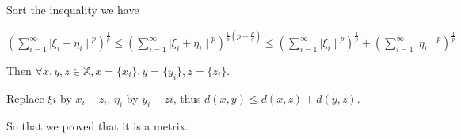 \documentclass[twoside,a4paper]{article}
\begin{document}
Sort the inequality we have 

$(\sum_{i=1}^{\infty}{\mid\xi_{i} + \eta_{i}\mid}^{p})^{\frac{1}{p}} \leq (\sum_{i=1}^{\infty}{\mid\xi_{i} + \eta_{i}\mid}^{p})^{\frac{1}{p}(p - \frac{p}{q})} \leq (\sum_{i=1}^{\infty}{\mid\xi_{i}\mid}^{p})^{\frac{1}{p}}+(\sum_{i=1}^{\infty}{\mid\eta_{i}\mid}^{p})^{\frac{1}{p}}$

Then $\forall x,y,z \in \mathbb{X}, x=\{x_{i}\}, y=\{y_{i}\}, z=\{z_{i}\}$.

Replace $\xi{i}$ by $x_{i} - z_{i}$, $\eta_{i}$ by $y_{i} - z{i}$, thus $d(x,y) \leq d(x,z) + d(y,z)$.

So that we proved that it is a metrix.
\end{document}
